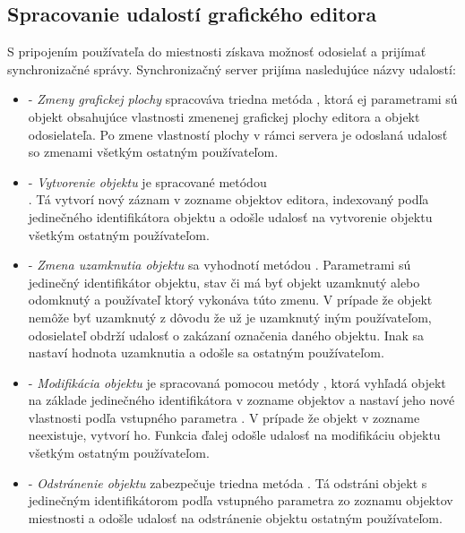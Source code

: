 \subsection{Spracovanie udalostí grafického editora}
S pripojením používateľa do miestnosti získava možnosť odosielať a prijímať synchronizačné správy. Synchronizačný server prijíma nasledujúce názvy udalostí:
\begin{itemize}
	
	\item {} - \textit{Zmeny grafickej plochy} spracováva triedna metóda , ktorá ej parametrami sú objekt  obsahujúce vlastnosti zmenenej grafickej plochy editora a  objekt odosielateľa. Po zmene vlastností plochy v rámci servera je odoslaná udalosť so zmenami všetkým ostatným používateľom.
	
	\item {} - \textit{Vytvorenie objektu} je spracované metódou \\. Tá vytvorí nový záznam v zozname objektov editora, indexovaný podľa jedinečného identifikátora objektu a odošle udalosť na vytvorenie objektu všetkým ostatným používateľom.
	
	\item {} - \textit{Zmena uzamknutia objektu} sa vyhodnotí metódou . Parametrami sú jedinečný identifikátor objektu, stav či má byť objekt uzamknutý alebo odomknutý a používateľ ktorý vykonáva túto zmenu. V prípade že objekt nemôže byť uzamknutý z dôvodu že už je uzamknutý iným používateľom, odosielateľ obdrží udalosť o zakázaní označenia daného objektu. Inak sa nastaví hodnota uzamknutia a odošle sa ostatným používateľom.
	
	\item {} - \textit{Modifikácia objektu} je spracovaná pomocou metódy , ktorá vyhľadá objekt na základe jedinečného identifikátora v zozname objektov a nastaví jeho nové vlastnosti podľa vstupného parametra . V prípade že objekt v zozname neexistuje, vytvorí ho. Funkcia ďalej odošle udalosť na modifikáciu objektu všetkým ostatným používateľom.
	
	\item {} - \textit{Odstránenie objektu} zabezpečuje triedna metóda . Tá odstráni objekt s jedinečným identifikátorom podľa vstupného parametra zo zoznamu objektov miestnosti a odošle udalosť na odstránenie objektu ostatným používateľom.
	

\end{itemize}
